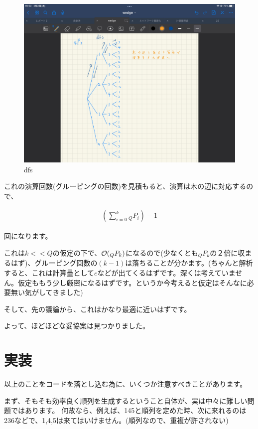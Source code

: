 \documentclass[a4paper, 10pt, dvipdfmx]{jlreq}
\begin{document}
\begin{figure}[htbp]
    \begin{center}
        \includegraphics[width=150mm]{dfs.jpg}
        \caption{dfs}
        \label{img:dfs}
    \end{center}
\end{figure}

これの演算回数(グルーピングの回数)を見積もると、演算は木の辺に対応するので、

\begin{align*}
    \left(\sum_{i=0}^{k} {}_Q P_i \right) - 1
\end{align*}

回になります。

これは$k<<Q$の仮定の下で、$\order{{}_Q P_k}$になるので(少なくとも${}_Q P_k$の$２$倍に収まるはず)、グルーピング回数の$(k-1)$は落ちることが分かます。(ちゃんと解析すると、これは計算量として$e$などが出てくるはずです。深くは考えていません。仮定ももう少し厳密になるはずです。というか今考えると仮定はそんなに必要無い気がしてきました)

そして、先の議論から、これはかなり最適に近いはずです。

よって、ほどほどな妥協案は見つかりました。

\section{実装}

以上のことをコードを落とし込む為に、いくつか注意すべきことがあります。

まず、そもそも効率良く順列を生成するということ自体が、実は中々に難しい問題ではあります。
何故なら、例えば、145と順列を定めた時、次に来れるのは236などで、1,4,5は来てはいけません。(順列なので、重複が許されない)
\end{document}
